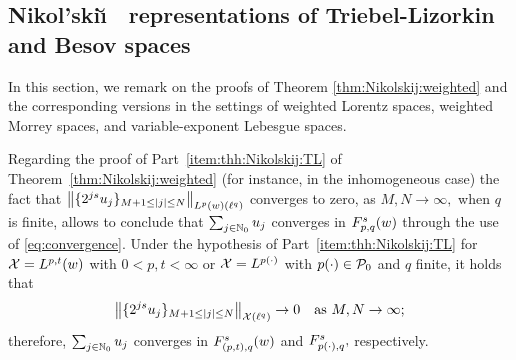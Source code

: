 
\subsection{Nikol'ski\u\i$\text{ }$ representations of Triebel-Lizorkin and Besov spaces}\label{appendix}
In this section, we remark on the proofs of Theorem \ref{thm:Nikolskij:weighted} and the corresponding versions in the settings of weighted Lorentz spaces, weighted Morrey spaces, and variable-exponent Lebesgue spaces. 

Regarding the proof of Part~\eqref{item:thh:Nikolskij:TL} of Theorem~\ref{thm:Nikolskij:weighted} (for instance, in the inhomogeneous case) the fact that $\norm{\{2^{js} u_j\}_{M+1\le \abs{j}\le N}}{\lebw{p}{w}(\ell^q)}$ converges to zero, as $M,N\to\infty,$  when $q$ is finite, allows to conclude that $\sum_{j\in\naz} u_j$ converges in $\itlw{p}{s}{q}{w}$ through the use of \eqref{eq:convergence}. Under the hypothesis of  Part~\eqref{item:thh:Nikolskij:TL} for $\mathcal{X}=\lebw{p,t}{w}$ with $0<p,t<\infty$ or $\mathcal{X}=\Lp$ with $\pp\in \mathcal{P}_0$ and $q$  finite,  it holds that 
\begin{equation}\label{eq:cauchyseq}
\norm{\{2^{js} u_j\}_{M+1\le \abs{j}\le N}}{\mathcal{X}(\ell^q)}\to 0\quad \text{as } M,N\to\infty;
\end{equation}
therefore, $\sum_{j\in\naz} u_j$ converges in $\itlw{(p,t)}{s}{q}{w}$ and  $\itl{\pp}{s}{q},$  respectively.

